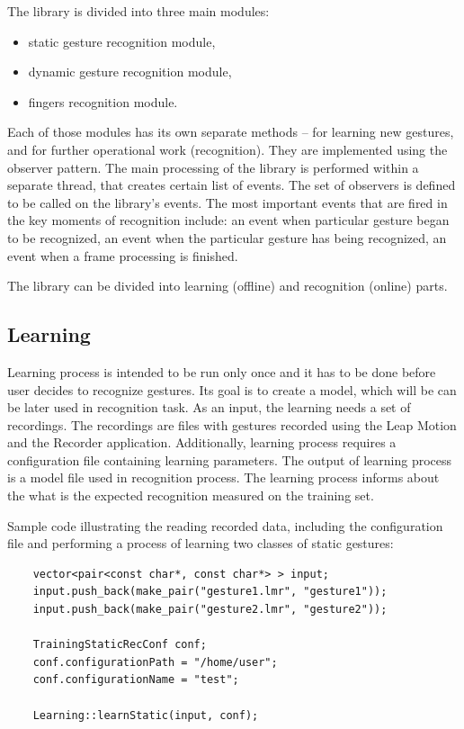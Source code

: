 The library is divided into three main modules:
\begin{itemize}
\item static gesture recognition module,
\item dynamic gesture recognition module,
\item fingers recognition module.
\end{itemize}

Each of those modules has its own separate methods -- for learning new gestures, and for further operational work (recognition). They are implemented using the observer pattern. 
The main processing of the library is performed within a separate thread, that creates certain list of events.
The set of observers is defined to be called on the library's events.
The most important events that are fired in the key moments of recognition include: an event when particular gesture began to be recognized, an event when the particular gesture has being recognized, an event when a frame processing is finished.

The library can be divided into learning (offline) and recognition (online) parts.
	
\subsection{Learning}

Learning process is intended to be run only once and it has to be done before user decides to recognize gestures. Its goal is to create a model, which will be can be later used in recognition task. As an input, the learning needs a set of recordings. The recordings are files with gestures recorded using the Leap Motion and the Recorder application. Additionally, learning process requires a configuration file containing learning parameters. The output of learning process is a model file used in recognition process. 
The learning process informs about the what is the expected recognition measured on the training set.

Sample code illustrating the reading recorded data, including the configuration file and performing a process of learning two classes of static gestures:
\begin{lstlisting}
	vector<pair<const char*, const char*> > input;
	input.push_back(make_pair("gesture1.lmr", "gesture1"));
	input.push_back(make_pair("gesture2.lmr", "gesture2"));

	TrainingStaticRecConf conf;
	conf.configurationPath = "/home/user";
	conf.configurationName = "test";

	Learning::learnStatic(input, conf);
\end{lstlisting}


